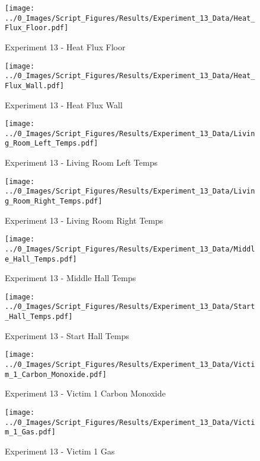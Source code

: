	\begin{figure}[H]
		\centering
		\texttt{[image: ../0\_Images/Script\_Figures/Results/Experiment\_13\_Data/Heat\_Flux\_Floor.pdf]}
		\caption[]{Experiment 13 - Heat Flux Floor}
	\end{figure}
 
	\clearpage

	\begin{figure}[H]
		\centering
		\texttt{[image: ../0\_Images/Script\_Figures/Results/Experiment\_13\_Data/Heat\_Flux\_Wall.pdf]}
		\caption[]{Experiment 13 - Heat Flux Wall}
	\end{figure}
 

	\begin{figure}[H]
		\centering
		\texttt{[image: ../0\_Images/Script\_Figures/Results/Experiment\_13\_Data/Living\_Room\_Left\_Temps.pdf]}
		\caption[]{Experiment 13 - Living Room Left Temps}
	\end{figure}
 
	\clearpage

	\begin{figure}[H]
		\centering
		\texttt{[image: ../0\_Images/Script\_Figures/Results/Experiment\_13\_Data/Living\_Room\_Right\_Temps.pdf]}
		\caption[]{Experiment 13 - Living Room Right Temps}
	\end{figure}
 

	\begin{figure}[H]
		\centering
		\texttt{[image: ../0\_Images/Script\_Figures/Results/Experiment\_13\_Data/Middle\_Hall\_Temps.pdf]}
		\caption[]{Experiment 13 - Middle Hall Temps}
	\end{figure}
 
	\clearpage

	\begin{figure}[H]
		\centering
		\texttt{[image: ../0\_Images/Script\_Figures/Results/Experiment\_13\_Data/Start\_Hall\_Temps.pdf]}
		\caption[]{Experiment 13 - Start Hall Temps}
	\end{figure}
 

	\begin{figure}[H]
		\centering
		\texttt{[image: ../0\_Images/Script\_Figures/Results/Experiment\_13\_Data/Victim\_1\_Carbon\_Monoxide.pdf]}
		\caption[]{Experiment 13 - Victim 1 Carbon Monoxide}
	\end{figure}
 
	\clearpage

	\begin{figure}[H]
		\centering
		\texttt{[image: ../0\_Images/Script\_Figures/Results/Experiment\_13\_Data/Victim\_1\_Gas.pdf]}
		\caption[]{Experiment 13 - Victim 1 Gas}
	\end{figure}
 

